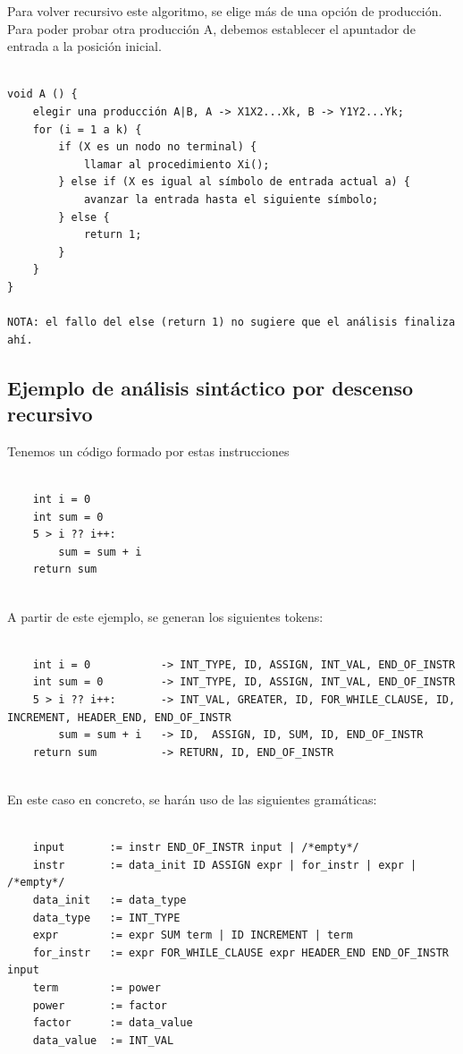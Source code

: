 \documentclass[11pt, english]{article}
\begin{document}
Para volver recursivo este algoritmo, se elige más de una opción de producción. Para poder probar otra producción A, debemos establecer el apuntador de entrada a la posición inicial.

\begin{lstlisting}

void A () {
	elegir una producción A|B, A -> X1X2...Xk, B -> Y1Y2...Yk;
	for (i = 1 a k) {
		if (X es un nodo no terminal) {
			llamar al procedimiento Xi();
		} else if (X es igual al símbolo de entrada actual a) {
			avanzar la entrada hasta el siguiente símbolo;
		} else {
			return 1;
		}
	}
}

NOTA: el fallo del else (return 1) no sugiere que el análisis finaliza ahí.

\end{lstlisting}

\newpage

\subsection{Ejemplo de análisis sintáctico por descenso recursivo}

Tenemos un código formado por estas instrucciones

\begin{lstlisting}

	int i = 0
	int sum = 0
	5 > i ?? i++:
		sum = sum + i
	return sum
	
\end{lstlisting}

A partir de este ejemplo, se generan los siguientes tokens:

\begin{lstlisting}
	
	int i = 0 			-> INT_TYPE, ID, ASSIGN, INT_VAL, END_OF_INSTR
	int sum = 0			-> INT_TYPE, ID, ASSIGN, INT_VAL, END_OF_INSTR
	5 > i ?? i++:		-> INT_VAL, GREATER, ID, FOR_WHILE_CLAUSE, ID, INCREMENT, HEADER_END, END_OF_INSTR
		sum = sum + i	-> ID, 	ASSIGN, ID, SUM, ID, END_OF_INSTR
	return sum 			-> RETURN, ID, END_OF_INSTR
	
\end{lstlisting}

En este caso en concreto, se harán uso de las siguientes gramáticas:

\begin{lstlisting}

	input 		:= instr END_OF_INSTR input | /*empty*/
	instr 		:= data_init ID ASSIGN expr | for_instr | expr | /*empty*/
	data_init 	:= data_type
	data_type	:= INT_TYPE
	expr 		:= expr SUM term | ID INCREMENT | term
	for_instr	:= expr FOR_WHILE_CLAUSE expr HEADER_END END_OF_INSTR input
	term		:= power
	power		:= factor
	factor		:= data_value
	data_value	:= INT_VAL

\end{lstlisting}
\end{document}
